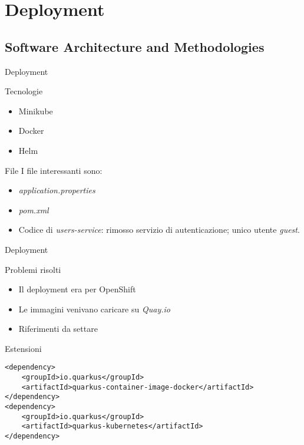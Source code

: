 \section{Deployment}

\subsection{Software Architecture and Methodologies}

\begin{frame}{Deployment}
    \begin{block}{Tecnologie}
        \begin{itemize}
            \item Minikube
            \item Docker
            \item Helm
        \end{itemize}
    \end{block}
    \begin{block}{File}
        I file interessanti sono:
        \begin{itemize}
            \item \textit{application.properties}
            \item \textit{pom.xml}
            \item Codice di \textit{users-service}: rimosso servizio di autenticazione; unico utente \textit{guest}.
        \end{itemize}
    \end{block}
\end{frame}

\begin{frame}[fragile]{Deployment}
    \begin{block}{Problemi risolti}
        \begin{itemize}
            \item Il deployment era per OpenShift
            \item Le immagini venivano caricare su \textit{Quay.io}
            \item Riferimenti da settare
        \end{itemize}
    \end{block}
    \begin{block}{Estensioni}
        \begin{verbatim}
<dependency>
    <groupId>io.quarkus</groupId>
    <artifactId>quarkus-container-image-docker</artifactId>
</dependency>
<dependency>
    <groupId>io.quarkus</groupId>
    <artifactId>quarkus-kubernetes</artifactId>
</dependency>
        \end{verbatim}
    \end{block}
\end{frame}

